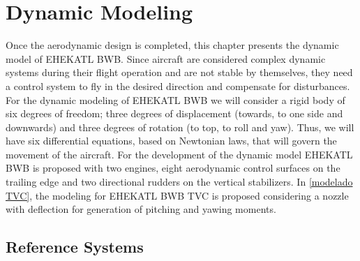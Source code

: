 \chapter{Dynamic Modeling}

Once the aerodynamic design is completed, this chapter presents the dynamic model of EHEKATL BWB. Since aircraft are considered complex dynamic systems during their flight operation and are not stable by themselves, they need a control system to fly in the desired direction and compensate for disturbances.
%
 For the dynamic modeling of EHEKATL BWB we will consider a rigid body of six degrees of freedom; three degrees of displacement (towards, to one side and downwards) and three degrees of rotation (to top, to roll and yaw). Thus, we will have six differential equations, based on Newtonian laws, that will govern the movement of the aircraft. 
%
For the development of the dynamic model EHEKATL BWB is proposed with two engines, eight aerodynamic control surfaces on the trailing edge and two directional rudders on the vertical stabilizers.
%
In \ref{modelado TVC}, the modeling for EHEKATL BWB TVC is proposed considering a nozzle with deflection for generation of pitching and yawing moments. 
  
\section{Reference Systems}

